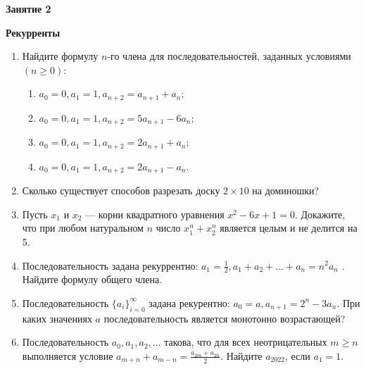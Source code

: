 \documentclass{article}
\begin{document}
\large
	
\begin{center}
	\textbf{Занятие 2}
\end{center}
\begin{center}
	\textbf{Рекурренты}
\end{center}


\begin{enumerate}[label*=\protect\fbox{\arabic{enumi}}]
	
\item Найдите формулу $n$-го члена для последовательностей, заданных условиями $( n  \geqslant 0)$:
\begin{enumerate}
	\item $a_0 = 0, a_1 = 1, a_{n + 2} = a_{n + 1} + a_n;$
	\item $a_0 = 0, a_1 = 1, a_{n + 2} = 5a_{n + 1} - 6a_n;$ 
	\item $a_0 = 0, a_1 = 1, a_{n + 2} = 2a_{n + 1} + a_n;$ 
	\item $a_0 = 0, a_1 = 1, a_{n + 2} = 2a_{n + 1} - a_n.$ 
\end{enumerate}

	
\item Сколько существует способов разрезать доску $2 \times 10$ на доминошки?

\item Пусть $ x_1 $ и $ x_2 $ — корни квадратного уравнения $ x^2 - 6x + 1 = 0 $. Докажите, что при любом натуральном $ n $ число $ x^n_1 + x^n_2 $ является целым и не делится на 5.

\item Последовательность задана рекуррентно: $ a_1 = \frac{1}{2} , a_1 + a_2 + . . . + a_n = n^2 a_n $ . Найдите формулу общего члена.

\item Последовательность $ \{a_i\}^{\infty}_{i=0} $ задана рекурентно: $ a_0 = a, a_{n+1} = 2^n - 3a_n $. При каких значениях $ a $ последовательность является монотонно возрастающей?

\item Последовательность $a_0, a_1, a_2, \ldots$ такова, что для всех неотрицательных $m \geq n$ выполняется условие $a_{m+n} + a_{m-n} = \frac{a_{2m} + a_{2n}}{2}$. Найдите $a_{2022}$, если $a_1 = 1$.


\end{enumerate}
\end{document}
